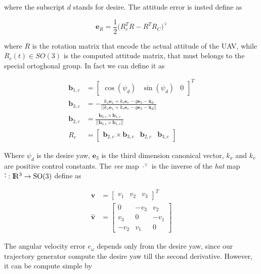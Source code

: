 \noindent where the subscript $d$ stands for desire. The attitude error is insted define as

\begin{equation}
	\mathbf{e}_R = \frac{1}{2}\bigl(R_c^TR-R^TR_C \bigl)^{\vee}
\end{equation}

\noindent where $R$ is the rotation matrix that encode the actual attitude of the UAV, while $R_c(t) \in SO(3)$ is the computed attitude matrix, that must belongs to the special ortoghonal group. In fact we can define it as

\begin{align}
	\mathbf{b}_{1,c} &= \begin{bmatrix} \cos(\psi_d) & \sin(\psi_d) & 0 \end{bmatrix}^T \\
	\mathbf{b}_{3,c} &= -\frac{k_x\mathbf{e}_x+k_v\mathbf{e}_v-g\mathbf{e}_3-\ddot{\mathbf{x}}_d}{||k_x\mathbf{e}_x+k_v\mathbf{e}_v-g\mathbf{e}_3-\ddot{\mathbf{x}}_d||} \\
	\mathbf{b}_{2,c} &= \frac{\mathbf{b}_{3,c}\times\mathbf{b}_{1,c}}{||\mathbf{b}_{3,c}\times\mathbf{b}_{1,c}||} \\
	R_c &= \left[\begin{array}{c|c|c}\mathbf{b}_{2,c}\times\mathbf{b}_{3,c} & \mathbf{b}_{2,c} & \mathbf{b}_{3,c} \end{array}\right]
\end{align}

\noindent Where $\psi_d$ is the desire yaw, $\mathbf{e}_3$ is the third dimension canonical vector, $k_x$ and $k_v$ are positive control constants. The \textit{vee} map $\cdot^{\vee}$ is the inverse of the \textit{hat} map $\hat{\cdot}: \rm I\!R^3 \rightarrow SO(3)$ define as

\begin{align}
	\mathbf{v} &= \begin{bmatrix} v_1 & v_2 & v_3 \end{bmatrix}^T \nonumber \\ 
	\hat{\mathbf{v}} &= 
	\begin{bmatrix}
		0    & -v_3 & v_2 \\
		v_3  & 0    & -v_1 \\
		-v_2 & v_1  & 0
	\end{bmatrix}
\end{align}

\noindent The angular velocity error $e_{\omega}$ depends only from the desire yaw, since our trajectory generator compute the desire yaw till the second derivative. However, it can be compute simple by 

